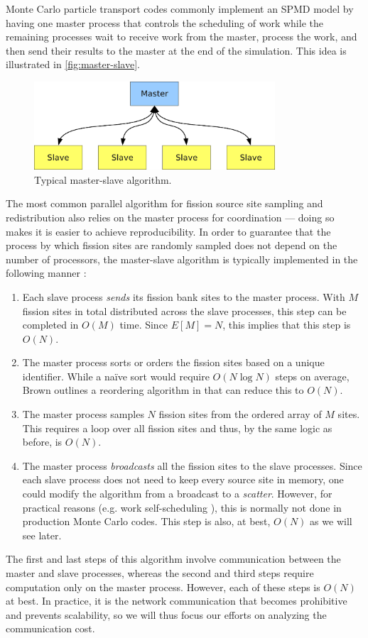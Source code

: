 Monte Carlo particle transport codes commonly implement an SPMD model by having
one master process that controls the scheduling of work while the remaining
processes wait to receive work from the master, process the work, and then send
their results to the master at the end of the simulation. This idea is
illustrated in \autoref{fig:master-slave}.
\begin{figure}[ht!]
  \centering
  \includegraphics[width=0.8\textwidth]{figures/ch3/master-slave/master-slave.pdf}
  \caption{Typical master-slave algorithm.}
  \label{fig:master-slave}
\end{figure}
The most common parallel algorithm for fission source site sampling and
redistribution also relies on the master process for coordination --- doing so
makes it is easier to achieve reproducibility. In order to guarantee that the
process by which fission sites are randomly sampled does not depend on the
number of processors, the master-slave algorithm is typically implemented in the
following manner \cite{lanl-x5-2008}:
\begin{enumerate}
\item Each slave process \emph{sends} its fission bank sites to the master
  process. With $M$ fission sites in total distributed across the slave
  processes, this step can be completed in $O(M)$ time. Since $E[M] = N$, this
  implies that this step is $O(N)$.
\item The master process sorts or orders the fission sites based on a unique
  identifier. While a naïve sort would require $O(N \log N)$ steps on average,
  Brown outlines a reordering algorithm in \cite{trans-brown-1992} that can
  reduce this to $O(N)$.
\item The master process samples $N$ fission sites from the ordered array of $M$
  sites. This requires a loop over all fission sites and thus, by the same logic
  as before, is $O(N)$.
\item The master process \emph{broadcasts} all the fission sites to the slave
  processes. Since each slave process does not need to keep every source site in
  memory, one could modify the algorithm from a broadcast to a
  \emph{scatter}. However, for practical reasons (e.g. work self-scheduling
  \cite{lanl-brown-2005}), this is normally not done in production Monte Carlo
  codes. This step is also, at best, $O(N)$ as we will see later.
\end{enumerate}
The first and last steps of this algorithm involve communication between the
master and slave processes, whereas the second and third steps require
computation only on the master process. However, each of these steps is $O(N)$
at best. In practice, it is the network communication that becomes prohibitive
and prevents scalability, so we will thus focus our efforts on analyzing the
communication cost.


